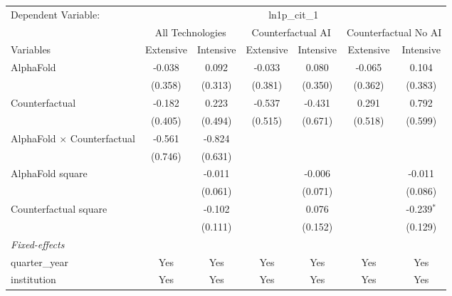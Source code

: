 \begingroup
\centering
\begin{tabular}{lcccccc}
   \tabularnewline \midrule \midrule
   Dependent Variable: & \multicolumn{6}{c}{ln1p\_cit\_1}\\
 & \multicolumn{2}{c}{All Technologies} & \multicolumn{2}{c}{Counterfactual AI} & \multicolumn{2}{c}{Counterfactual No AI} \\
\cmidrule(lr){1-1}\cmidrule(lr){2-3} \cmidrule(lr){4-5} \cmidrule(lr){6-7}
Variables & \multicolumn{1}{c}{Extensive} & \multicolumn{1}{c}{Intensive} & \multicolumn{1}{c}{Extensive} & \multicolumn{1}{c}{Intensive} & \multicolumn{1}{c}{Extensive} & \multicolumn{1}{c}{Intensive} \\
\cmidrule(lr){1-1}\cmidrule(lr){2-2} \cmidrule(lr){3-3} \cmidrule(lr){4-4} \cmidrule(lr){5-5} \cmidrule(lr){6-6} \cmidrule(lr){7-7}
   AlphaFold                          & -0.038  & 0.092   & -0.033  & 0.080   & -0.065  & 0.104\\   
                                      & (0.358) & (0.313) & (0.381) & (0.350) & (0.362) & (0.383)\\   
   Counterfactual                     & -0.182  & 0.223   & -0.537  & -0.431  & 0.291   & 0.792\\   
                                      & (0.405) & (0.494) & (0.515) & (0.671) & (0.518) & (0.599)\\   
   AlphaFold $\times$ Counterfactual  & -0.561  & -0.824  &         &         &         &   \\   
                                      & (0.746) & (0.631) &         &         &         &   \\   
   AlphaFold square                   &         & -0.011  &         & -0.006  &         & -0.011\\   
                                      &         & (0.061) &         & (0.071) &         & (0.086)\\   
   Counterfactual square              &         & -0.102  &         & 0.076   &         & -0.239$^{*}$\\   
                                      &         & (0.111) &         & (0.152) &         & (0.129)\\   
   \midrule
   \emph{Fixed-effects}\\
   quarter\_year                      & Yes     & Yes     & Yes     & Yes     & Yes     & Yes\\  
   institution                        & Yes     & Yes     & Yes     & Yes     & Yes     & Yes\\  

\end{tabular}
